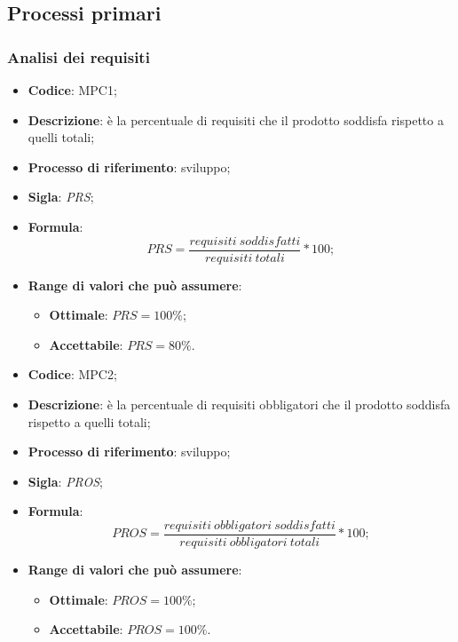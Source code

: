 \subsection{Processi primari}
\subsubsection{Analisi dei requisiti}
\vspace{-1cm}
\begin{itemize}
	\item \textbf{Codice}: MPC1;
	\item \textbf{Descrizione}: è la percentuale di requisiti che il prodotto soddisfa rispetto a quelli totali;
	\item \textbf{Processo di riferimento}: sviluppo;
	\item \textbf{Sigla}: \textit{PRS};
	\item \textbf{Formula}: \[ PRS = \frac{requisiti \ soddisfatti}{requisiti \ totali} \ast 100; \]
	\item \textbf{Range di valori che può assumere}:
		\begin{itemize}
			\item \textbf{Ottimale}: $PRS = 100 \%$;
			\item \textbf{Accettabile}: $PRS = 80 \%$.
		\end{itemize}
\end{itemize}
\vspace{-1cm}
\begin{itemize}
	\item \textbf{Codice}: MPC2;
	\item \textbf{Descrizione}: è la percentuale di requisiti obbligatori che il prodotto soddisfa rispetto a quelli totali;
	\item \textbf{Processo di riferimento}: sviluppo;
	\item \textbf{Sigla}: \textit{PROS};
	\item \textbf{Formula}: \[ PROS = \frac{requisiti \ obbligatori \ soddisfatti}{requisiti \ obbligatori \ totali} \ast 100; \]
	\item \textbf{Range di valori che può assumere}:
		\begin{itemize}
			\item \textbf{Ottimale}: $PROS = 100 \%$;
			\item \textbf{Accettabile}: $PROS = 100 \%$.
		\end{itemize}
\end{itemize}

